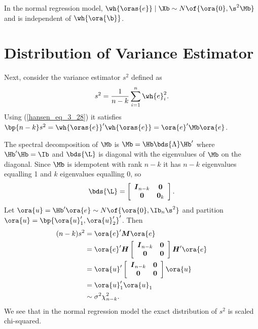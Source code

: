 \begin{theorem} \label{hansen_thm_5_6}
    In the normal regression model, $\wh{\oras{e}} \mid \Xb \sim N\of{\ora{0}, \s^2 \Mb}$ and is independent of $\wh{\ora{\b}}$.
\end{theorem}


\section{Distribution of Variance Estimator}

Next, consider the variance estimator $s^2$ defined as 
\begin{equation}
    \notag
    s^2 = \frac{1}{n - k} \sum_{i=1}^{n} \wh{e}_i^2.
\end{equation}
Using (\ref{hansen_eq_3_28}) it satisfies $\bp{n-k} s^2 = \wh{\oras{e}}^\prime \wh{\oras{e}} = \ora{e}^\prime \Mb \ora{e}$.

The spectral decomposition of $\Mb$ is $\Mb = \Hb \bds{\Lambda} \Hb^\prime$ where $\Hb^\prime \Hb = \Ib$ and $\bds{\L}$ is diagonal with the eigenvalues of $\Mb$ on the diagonal. Since $\Mb$ is idempotent with rank $n-k$ it has $n-k$ eigenvalues equalling 1 and $k$ eigenvalues equalling 0, so 
\begin{equation}
    \notag
    \bds{\L} = \left[\begin{array}{cc}
        \boldsymbol{I}_{n-k} & \mathbf{0} \\
        \mathbf{0} & \mathbf{0}_k
        \end{array}\right].
\end{equation}
Let $\ora{u} = \Hb^\prime \ora{e} \sim N\of{\ora{0}, \Ib_n \s^2}$ and partition $\ora{u} = \bp{\ora{u}_1^\prime, \ora{u}_2^\prime}^\prime$. Then 
\begin{equation}
    \notag
    \begin{aligned}
        (n-k) s^2 & =\ora{e}^{\prime} \boldsymbol{M} \ora{e} \\
        & =\ora{e}^{\prime} \boldsymbol{H}\left[\begin{array}{cc}
        \boldsymbol{I}_{n-k} & \mathbf{0} \\
        \mathbf{0} & \mathbf{0}
        \end{array}\right] \boldsymbol{H}^{\prime} \ora{e} \\
        & =\ora{u}^{\prime}\left[\begin{array}{cc}
        \boldsymbol{I}_{n-k} & \mathbf{0} \\
        \mathbf{0} & \mathbf{0}
        \end{array}\right] \ora{u} \\
        & =\ora{u}_1^{\prime} \ora{u}_1 \\
        & \sim \sigma^2 \chi_{n-k}^2 .
    \end{aligned}
\end{equation}
We see that in the normal regression model the exact distribution of $s^2$ is scaled chi-squared.

